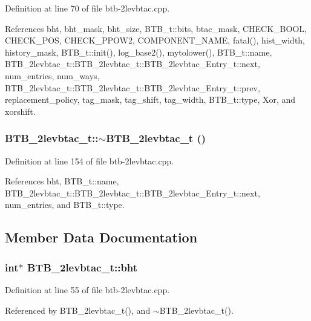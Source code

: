 Definition at line 70 of file btb-2levbtac.cpp.

References bht, bht\_\-mask, bht\_\-size, BTB\_\-t::bits, btac\_\-mask, CHECK\_\-BOOL, CHECK\_\-POS, CHECK\_\-PPOW2, COMPONENT\_\-NAME, fatal(), hist\_\-width, history\_\-mask, BTB\_\-t::init(), log\_\-base2(), mytolower(), BTB\_\-t::name, BTB\_\-2levbtac\_\-t::BTB\_\-2levbtac\_\-t::BTB\_\-2levbtac\_\-Entry\_\-t::next, num\_\-entries, num\_\-ways, BTB\_\-2levbtac\_\-t::BTB\_\-2levbtac\_\-t::BTB\_\-2levbtac\_\-Entry\_\-t::prev, replacement\_\-policy, tag\_\-mask, tag\_\-shift, tag\_\-width, BTB\_\-t::type, Xor, and xorshift.
\subsubsection[{$\sim$BTB\_\-2levbtac\_\-t}]{\setlength{\rightskip}{0pt plus 5cm}BTB\_\-2levbtac\_\-t::$\sim$BTB\_\-2levbtac\_\-t ()\hspace{0.3cm}{\tt  [inline]}}\label{classBTB__2levbtac__t_7e49390d90ecb67a003aac4a28efc90b}




Definition at line 154 of file btb-2levbtac.cpp.

References bht, BTB\_\-t::name, BTB\_\-2levbtac\_\-t::BTB\_\-2levbtac\_\-t::BTB\_\-2levbtac\_\-Entry\_\-t::next, num\_\-entries, and BTB\_\-t::type.

\subsection{Member Data Documentation}
\subsubsection[{bht}]{\setlength{\rightskip}{0pt plus 5cm}int$\ast$ {\bf BTB\_\-2levbtac\_\-t::bht}\hspace{0.3cm}{\tt  [protected]}}\label{classBTB__2levbtac__t_09ea0fd8512c3b89db1e84c28fc19d26}




Definition at line 55 of file btb-2levbtac.cpp.

Referenced by BTB\_\-2levbtac\_\-t(), and $\sim$BTB\_\-2levbtac\_\-t().
